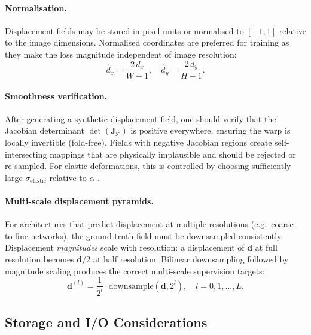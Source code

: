 \paragraph{Normalisation.}
Displacement fields may be stored in pixel units or normalised to $[-1, 1]$
relative to the image dimensions.  Normalised coordinates are preferred for
training as they make the loss magnitude independent of image resolution:
\begin{equation}
    \hat{d}_x = \frac{2\, d_x}{W - 1}, \quad
    \hat{d}_y = \frac{2\, d_y}{H - 1}.
    \label{eq:normalise}
\end{equation}

\paragraph{Smoothness verification.}
After generating a synthetic displacement field, one should verify that the
Jacobian determinant $\det(\mathbf{J}_{\mathcal{T}})$ is positive everywhere,
ensuring the warp is locally invertible (fold-free).  Fields with negative
Jacobian regions create self-intersecting mappings that are physically
implausible and should be rejected or re-sampled.  For elastic deformations,
this is controlled by choosing sufficiently large $\sigma_{\mathrm{elastic}}$
relative to $\alpha$ \cite{dalca2019unsupervised}.

\paragraph{Multi-scale displacement pyramids.}
For architectures that predict displacement at multiple resolutions (e.g.\
coarse-to-fine networks), the ground-truth field must be downsampled
consistently.  Displacement \emph{magnitudes} scale with resolution: a
displacement of $\mathbf{d}$ at full resolution becomes $\mathbf{d}/2$ at
half resolution.  Bilinear downsampling followed by magnitude scaling
produces the correct multi-scale supervision targets:
\begin{equation}
    \mathbf{d}^{(l)} =
    \frac{1}{2^{l}} \cdot \mathrm{downsample}(\mathbf{d}, 2^l),
    \quad l = 0, 1, \ldots, L.
    \label{eq:multiscale}
\end{equation}

\subsection{Storage and I/O Considerations}
\label{subsec:storage}

